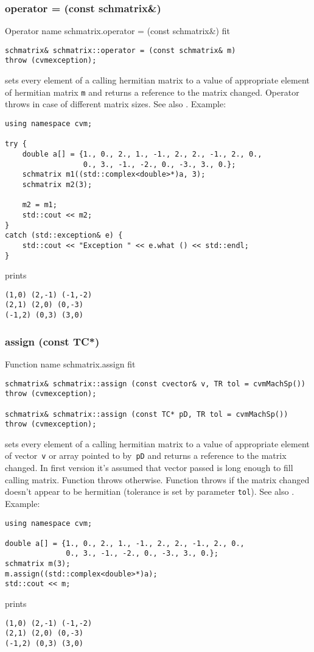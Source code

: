 \subsubsection{operator = (const schmatrix\&)}
Operator%
\pdfdest name {schmatrix.operator = (const schmatrix&)} fit
\begin{verbatim}
schmatrix& schmatrix::operator = (const schmatrix& m)
throw (cvmexception);
\end{verbatim}
sets  every element of a calling hermitian matrix to a value of
appropriate element of  hermitian matrix \verb"m"
and returns a reference to
the matrix changed.
Operator throws  
in case of different matrix sizes.
See also .
Example:
\begin{Verbatim}
using namespace cvm;

try {
    double a[] = {1., 0., 2., 1., -1., 2., 2., -1., 2., 0.,
                  0., 3., -1., -2., 0., -3., 3., 0.};
    schmatrix m1((std::complex<double>*)a, 3);
    schmatrix m2(3);
    
    m2 = m1;
    std::cout << m2;
}
catch (std::exception& e) {
    std::cout << "Exception " << e.what () << std::endl;
}
\end{Verbatim}
prints
\begin{Verbatim}
(1,0) (2,-1) (-1,-2)
(2,1) (2,0) (0,-3)
(-1,2) (0,3) (3,0)
\end{Verbatim}
\newpage



\subsubsection{assign (const TC*)}
Function%
\pdfdest name {schmatrix.assign} fit
\begin{verbatim}
schmatrix& schmatrix::assign (const cvector& v, TR tol = cvmMachSp())
throw (cvmexception);

schmatrix& schmatrix::assign (const TC* pD, TR tol = cvmMachSp())
throw (cvmexception);
\end{verbatim}
sets every element of a calling hermitian matrix to a value of
appropriate element of  vector~\verb'v'
or  array pointed to by~\verb"pD"
and returns a reference to
the matrix changed.
In first version it's assumed that vector passed is long
enough to fill calling matrix. Function throws  
otherwise.
Function throws  
if the matrix changed doesn't appear to be hermitian 
(tolerance is set by parameter \verb'tol').
See also .
Example:
\begin{Verbatim}
using namespace cvm;

double a[] = {1., 0., 2., 1., -1., 2., 2., -1., 2., 0.,
              0., 3., -1., -2., 0., -3., 3., 0.};
schmatrix m(3);
m.assign((std::complex<double>*)a);
std::cout << m;
\end{Verbatim}
prints
\begin{Verbatim}
(1,0) (2,-1) (-1,-2)
(2,1) (2,0) (0,-3)
(-1,2) (0,3) (3,0)
\end{Verbatim}
\newpage



